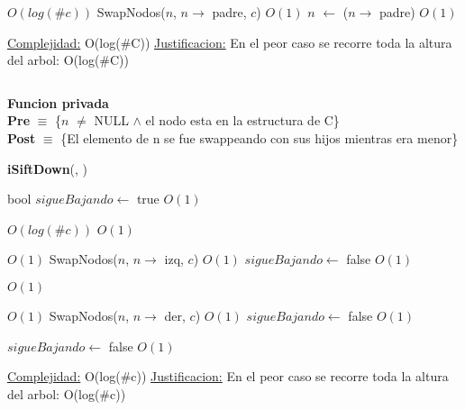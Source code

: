 \begin{Algoritmos}
\begin{algorithm}[H]
\begin{algorithmic}[1]
     \Comment $O(log(\#c))$
        \State SwapNodos($n$, $n \to$ padre, $c$) \Comment $O(1)$
        \State $n$ $\gets$ ($n \to$ padre) \Comment $O(1)$
    \EndWhile

    \medskip
    \Statex \underline{Complejidad:} O(log($\#$C))
    \Statex \underline{Justificacion:} En el peor caso se recorre toda la altura del arbol: O(log($\#$C))
\end{algorithmic}
\end{algorithm}



$ $\newline

\textbf{Funcion privada}\\
\textbf{Pre} $\equiv$ \{$n$ $\neq$ NULL $\land$ el nodo esta en la estructura de C\}\\%
\textbf{Post} $\equiv$ \{El elemento de n se fue swappeando con sus hijos mientras era menor\}%
\begin{algorithm}[H]
{\textbf{iSiftDown}(, )}
\begin{algorithmic}[1]

    \State bool $sigueBajando \gets$ true \Comment $O(1)$

      \Comment $O(log(\#c))$
         \Comment $O(1)$ 

             \Comment $O(1)$
                \State SwapNodos($n$, $n \to$ izq, $c$) \Comment $O(1)$
            \Else
                \State $sigueBajando \gets$ false \Comment $O(1)$
            \EndIf

        \Else
             \Comment $O(1)$
            
                 \Comment $O(1)$
                    \State SwapNodos($n$, $n \to$ der, $c$) \Comment $O(1)$
                \Else
                    \State $sigueBajando \gets$ false \Comment $O(1)$
                \EndIf
            
            \Else
                \State $sigueBajando \gets$ false \Comment $O(1)$
            \EndIf
        \EndIf


    \EndWhile 

    \medskip
    \Statex \underline{Complejidad:} O(log($\#$c))
    \Statex \underline{Justificacion:} En el peor caso se recorre toda la altura del arbol: O(log($\#$c))
\end{algorithmic}
\end{algorithm}




\end{Algoritmos}
